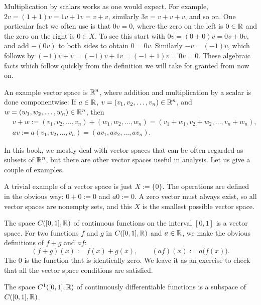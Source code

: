 Multiplication by scalars works as one would expect.
For example, $2v = (1+1)v = 1v + 1v = v+v$, similarly $3v = v+v+v$, and
so on.  
One particular fact we often use is that $0 v = 0$, where
the zero on the left is $0 \in {\mathbb{R}}$ and the zero on the right is $0 \in X$.
To see this start with
$0v = (0+0)v = 0v + 0v$, and add $-(0v)$ to both sides
to obtain $0 = 0v$.  Similarly $-v = (-1)v$, which follows by
$(-1)v+v = (-1)v + 1v = (-1+1)v = 0v = 0$.
These algebraic facts which follow quickly from the definition we will take
for granted from now on.

\begin{example}
An example vector space is ${\mathbb{R}}^n$, where addition
and multiplication by a scalar is done componentwise:
If $a \in {\mathbb{R}}$, $v = (v_1,v_2,\ldots,v_n) \in {\mathbb{R}}^n$, and $w =
(w_1,w_2,\ldots,w_n) \in {\mathbb{R}}^n$, then
\begin{align*}
& v+w :=
(v_1,v_2,\ldots,v_n) +
(w_1,w_2,\ldots,w_n) 
=
(v_1+w_1,v_2+w_2,\ldots,v_n+w_n) , \\
& a v :=
a (v_1,v_2,\ldots,v_n) =
(a v_1, a v_2,\ldots, a v_n) .
\end{align*}
\end{example}

In this book, we mostly deal with vector spaces that can be often regarded as
subsets of ${\mathbb{R}}^n$, but there are other vector spaces useful in
analysis.  Let us give a couple of examples.

\begin{example}
A trivial example of a vector space is just
$X := \{ 0 \}$.  The operations are defined in the obvious way: $0 + 0 := 0$
and $a0 := 0$.  A zero vector must always exist,
so all vector spaces are nonempty sets, and this $X$ is the smallest
possible vector space.
\end{example}

\begin{example}
The space $C([0,1],{\mathbb{R}})$ of continuous functions on the interval $[0,1]$
is a vector space.  For two functions $f$ and $g$ in $C([0,1],{\mathbb{R}})$ and
$a \in {\mathbb{R}}$, we make the obvious definitions of $f+g$ and $af$:
\begin{equation*}
(f+g)(x) := f(x) + g(x), \qquad (af) (x) := a\bigl(f(x)\bigr) .
\end{equation*}
The 0 is the function that is identically zero.  We leave it as an exercise
to check that all the vector space conditions are satisfied.

The space $C^1([0,1],{\mathbb{R}})$ of continuously differentiable functions is
a subspace of $C([0,1],{\mathbb{R}})$.
\end{example}


